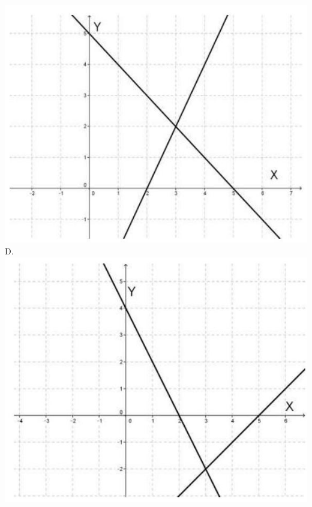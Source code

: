 \documentclass[10pt]{article}
\begin{document}
\includegraphics[max width=\textwidth, center]{2024_11_21_b8ac5f500a5bbb1b4ec5g-04}\\
D.\\
\includegraphics[max width=\textwidth, center]{2024_11_21_b8ac5f500a5bbb1b4ec5g-04(4)}
\end{document}
